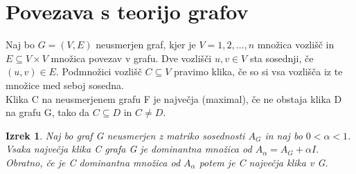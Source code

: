 \documentclass[a4paper]{article}
\newtheorem{theorem}{Izrek}
\begin{document}
\section{Povezava s teorijo grafov}
Naj bo $G=(V,E)$ neusmerjen graf, kjer je $V={1,2,\ldots,n}$ množica vozlišč in $E\subseteq V\times V$ množica povezav v grafu. Dve vozlišči $u, v \in V$ sta sosednji, če $(u, v) \in E$. Podmnožici vozlišč $C \subseteq V$ pravimo klika, če so si vsa vozlišča iz te množice med seboj sosedna.\\
Klika C na neusmerjenem grafu F je največja (maximal), če ne obstaja klika D na grafu G, tako da $C \subseteq D$ in $C \not= D$.
\begin{theorem}
Naj bo graf G neusmerjen z matriko sosednosti $A_G$ in naj bo $0 < \alpha < 1$. Vsaka največja klika C grafa G je dominantna množica od $A_\alpha = A_G + \alpha I$. Obratno, če je C dominantna množica od $A_\alpha$ potem je C največja klika v G.
\end{theorem}
\end{document}
